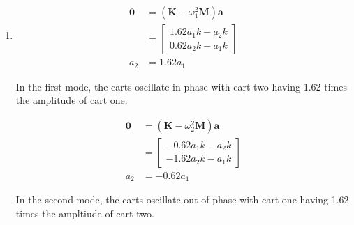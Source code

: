 \documentclass{article}
\renewcommand{\vec}[1]{\boldsymbol{\mathbf{#1}}}
\begin{document}
\begin{enumerate}
  \item

        \begin{align*}
          \vec{0} & = (\vec{K} - \omega_1^2 \vec{M}) \vec{a} \\
                  & = \begin{bmatrix}
                        1.62 a_1 k - a_2 k \\
                        0.62 a_2 k - a_1 k
                      \end{bmatrix}                     \\
          a_2     & = 1.62 a_1
        \end{align*}

        In the first mode, the carts oscillate in phase with cart two having 1.62 times the amplitude of cart one.

        \begin{align*}
          \vec{0} & = (\vec{K} - \omega_2^2 \vec{M}) \vec{a} \\
                  & = \begin{bmatrix}
                        -0.62 a_1 k - a_2 k \\
                        -1.62 a_2 k - a_1 k
                      \end{bmatrix}                    \\
          a_2     & = -0.62 a_1
        \end{align*}

        In the second mode, the carts oscillate out of phase with cart one having 1.62 times the ampltiude of cart two.
\end{enumerate}

\setcounter{subsection}{6}
\subsection{}
\end{document}
